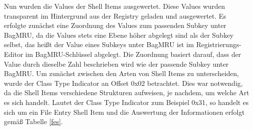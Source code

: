 Nun wurden die Values der Shell Items ausgewertet. Diese Values wurden transparent im Hintergrund aus der Registry geladen und ausgewertet. Es erfolgte zunächst eine Zuordnung des Values zum passenden Subkey unter BagMRU, da die Values stets eine Ebene höher abgelegt sind als der Subkey selbst, das heißt der Value eines Subkeys unter BagMRU ist im Registrierungs-Editor im BagMRU-Schlüssel abgelegt. Die Zuordnung basiert darauf, dass der Value durch dieselbe Zahl beschrieben wird wie der passende Subkey unter BagMRU. Um zunächst zwischen den Arten von Shell Items zu unterscheiden, wurde der Class Type Indicator an Offset 0x02 betrachtet. Dies war notwendig, da die Shell Items verschiedene Strukturen aufweisen, je nachdem, um welche Art es sich handelt. Lautet der Class Type Indicator zum Beispiel 0x31, so handelt es sich um ein File Entry Shell Item und die Auswertung der Informationen erfolgt gemäß Tabelle \ref{fes}.







